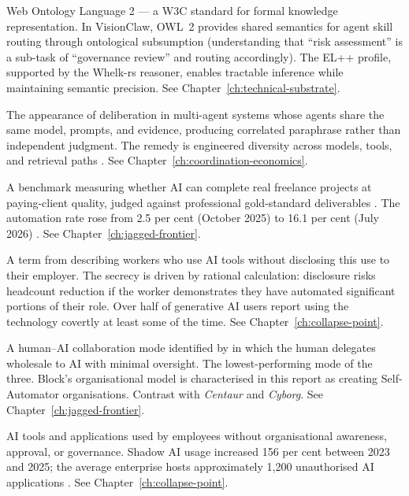 \begin{description}[style=nextline, leftmargin=2em, font=\bfseries\color{navyblue}]
\item[OWL~2]
Web Ontology Language 2 --- a W3C standard for formal knowledge representation. In VisionClaw, OWL~2 provides shared semantics for agent skill routing through ontological subsumption (understanding that ``risk assessment'' is a sub-task of ``governance review'' and routing accordingly). The EL++ profile, supported by the Whelk-rs reasoner, enables tractable inference while maintaining semantic precision. See Chapter~\ref{ch:technical-substrate}.

\item[Pseudo-Diversity]
The appearance of deliberation in multi-agent systems whose agents share the same model, prompts, and evidence, producing correlated paraphrase rather than independent judgment. The remedy is engineered diversity across models, tools, and retrieval paths \parencite{Liu2026}. See Chapter~\ref{ch:coordination-economics}.

\item[Remote Labor Index (RLI)]
A benchmark measuring whether AI can complete real freelance projects at paying-client quality, judged against professional gold-standard deliverables \parencite{RLI2025}. The automation rate rose from 2.5 per cent (October 2025) to 16.1 per cent (July 2026) \parencite{CAIS2026RLI}. See Chapter~\ref{ch:jagged-frontier}.

\item[Secret Cyborg]
A term from \textcite{Mollick2023SecretCyborgs} describing workers who use AI tools without disclosing this use to their employer. The secrecy is driven by rational calculation: disclosure risks headcount reduction if the worker demonstrates they have automated significant portions of their role. Over half of generative AI users report using the technology covertly at least some of the time. See Chapter~\ref{ch:collapse-point}.

\item[Self-Automator]
A human--AI collaboration mode identified by \textcite{Randazzo2024} in which the human delegates wholesale to AI with minimal oversight. The lowest-performing mode of the three. Block's organisational model is characterised in this report as creating Self-Automator organisations. Contrast with \emph{Centaur} and \emph{Cyborg}. See Chapter~\ref{ch:jagged-frontier}.

\item[Shadow AI]
AI tools and applications used by employees without organisational awareness, approval, or governance. Shadow AI usage increased 156 per cent between 2023 and 2025; the average enterprise hosts approximately 1,200 unauthorised AI applications \parencite{Gartner2025}. See Chapter~\ref{ch:collapse-point}.


\end{description}
